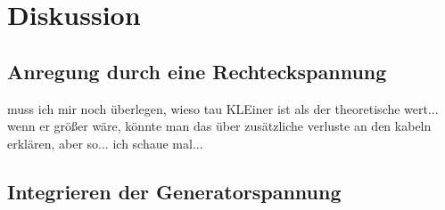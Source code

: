 \section{Diskussion}
\label{sec:Diskussion}

\subsection{Anregung durch eine Rechteckspannung}

muss ich mir noch überlegen, wieso tau KLEiner ist als der theoretische wert... wenn er größer wäre, könnte man das über 
zusätzliche verluste an den kabeln erklären, aber so... ich schaue mal... 

\subsection{Integrieren der Generatorspannung}

